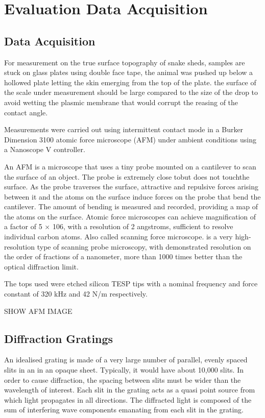 \chapter{Evaluation Data Acquisition}
\section{Data Acquisition}
For measurement on the true surface topography of snake sheds, samples are stuck on glass plates using double face tape, the animal was pushed up below a hollowed plate letting the skin emerging from the top of the plate. the surface of the scale under measurement should be large compared to the size of the drop to avoid wetting the plasmic membrane that would corrupt the reasing of the contact angle. 

Measurements were carried out using intermittent contact mode in a Burker Dimension 3100 atomic force microscope (AFM) under ambient conditions using a Nanoscope V controller. 

An AFM is a microscope that uses a tiny probe mounted on a cantilever to scan the surface of an object. The probe is extremely close tobut does not touchthe surface. As the probe traverses the surface, attractive and repulsive forces arising between it and the atoms on the surface induce forces on the probe that bend the cantilever. The amount of bending is measured and recorded, providing a map of the atoms on the surface. Atomic force microscopes can achieve magnification of a factor of 5 × 106, with a resolution of 2 angstroms, sufficient to resolve individual carbon atoms. Also called scanning force microscope.
is a very high-resolution type of scanning probe microscopy, with demonstrated resolution on the order of fractions of a nanometer, more than 1000 times better than the optical diffraction limit.

The tops used were etched silicon TESP tips with a nominal frequency and force constant of 320 kHz and 42 N/m respectively. 

SHOW AFM IMAGE

\section{Diffraction Gratings}
An idealised grating is made of a very large number of parallel, evenly spaced slits in an in an opaque sheet. Typically, it would have about 10,000 slits. In order to cause diffraction, the spacing between slits must be wider than the wavelength of interest. Each slit in the grating acts as a quasi point source from which light propagates in all directions. The diffracted light is composed of the sum of interfering wave components emanating from each slit in the grating.

